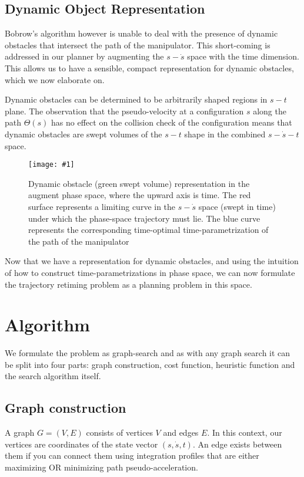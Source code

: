 \documentclass[letterpaper,12pt]{article} %
\newcommand{\ffig}[3]{
    \begin{figure}[h!]
    \centering
    \texttt{[image: \#1]}
    \caption{#2}
    \label{fig:#3}
    \end{figure}
}
\begin{document}
\subsection{Dynamic Object Representation}\label{subsec:dynobj}

Bobrow's algorithm however is unable to deal with the presence of dynamic obstacles that intersect the path of the manipulator. This short-coming is addressed in our planner by augmenting the $s-\dot{s}$ space with the time dimension. This allows us to have a sensible, compact representation for dynamic obstacles, which we now elaborate on.

Dynamic obstacles can be determined to be arbitrarily shaped regions in $s-t$ plane. The observation that the pseudo-velocity at a configuration $s$ along the path $\Theta(s)$ has no effect on the collision check of the configuration means that dynamic obstacles are swept volumes of the $s-t$ shape in the combined $s-\dot{s}-t$ space.

\ffig{pics/representation3d1}{Dynamic obstacle (green swept volume) representation in the augment phase space, where the upward axis is time. The red surface represents a limiting curve in the $s-\dot{s}$ space (swept in time) under which the phase-space trajectory must lie. The blue curve represents the corresponding time-optimal time-parametrization of the path of the manipulator}{dynobjrep}

Now that we have a representation for dynamic obstacles, and using the intuition of how to construct time-parametrizations in phase space, we can now formulate the trajectory retiming problem as a planning problem in this space.

\section{Algorithm}\label{subsec:alg}

We formulate the problem as graph-search and as with any graph search it can be split into four parts: graph construction, cost function, heuristic function and the search algorithm itself.

\subsection{Graph construction}\label{subsec:graph}

A graph $G = (V, E)$ consists of vertices $V$ and edges $E$. In this context, our vertices are coordinates of the state vector $(s, \dot{s}, t)$. An edge exists between them if you can connect them using integration profiles that are either maximizing OR minimizing path pseudo-acceleration.
\end{document}
